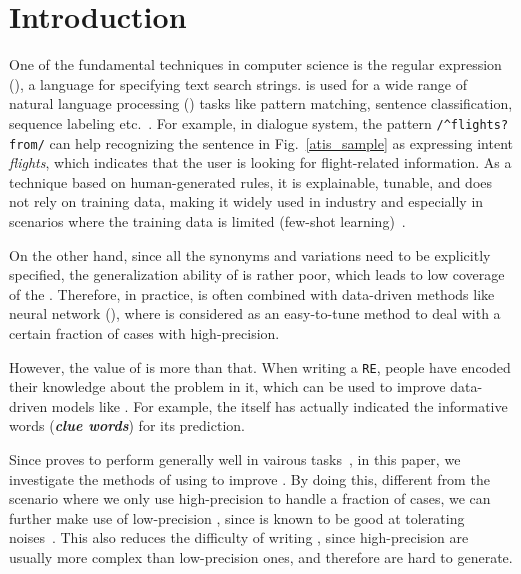 \section{Introduction}


One of the fundamental techniques in computer science is the regular expression (\RE), a language for specifying text search strings.  \RE is used for a wide range of natural language processing (\NLP) tasks like pattern matching, sentence classification, sequence labeling etc.~\cite{chang2014tokensregex}. 
For example, in dialogue system, the \RE pattern \texttt{/\textasciicircum flights? from/} can help
recognizing the sentence in Fig.~\ref{atis_sample} as expressing intent \emph{flights}, which indicates that the user is looking for
flight-related information. As a technique based on human-generated rules, it is explainable, tunable, and does not rely on training data,
making it widely used in industry and especially in scenarios where the training data is limited (few-shot learning)~\cite{gc2015big}.

On the other hand, since all the synonyms and variations need to be explicitly specified, the generalization ability of \RE is rather poor,
which leads to low coverage of the \REs. Therefore, in practice, \RE is often combined with data-driven methods like neural network
(\NN), where \RE is considered as an easy-to-tune method to deal with a certain fraction of cases with high-precision.

However, the value of \RE is more than that. When writing a \texttt{RE}, people have encoded their knowledge about the problem in it, which can be used to improve data-driven models like \NN. For example, the \RE itself has actually indicated the informative words
(\textbf{\emph{clue words}}) for its prediction.

Since \NN proves to perform generally well in vairous \NLP tasks~\cite{goldberg2017neural}, in this paper,
we investigate the methods of using \RE to improve \NN. By doing this, different from the scenario where we only use high-precision
\REs to handle a fraction of cases, we can further make use of low-precision \REs, since \NN is known to be good at
tolerating noises~\cite{xie2016disturblabel}. This also reduces the difficulty of writing \REs, since high-precision \REs
are usually more complex than low-precision ones, and therefore are hard to generate.


